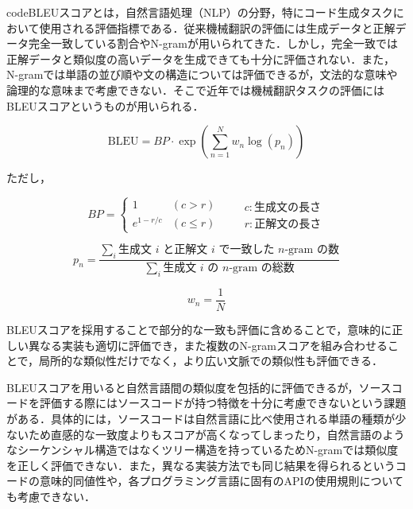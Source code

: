 \documentclass[11pt]{jreport}
\begin{document}
codeBLEUスコアとは，自然言語処理（NLP）の分野，特にコード生成タスクにおいて使用される評価指標である．従来機械翻訳の評価には生成データと正解データ完全一致している割合やN-gramが用いられてきた．しかし，完全一致では正解データと類似度の高いデータを生成できても十分に評価されない．また，N-gramでは単語の並び順や文の構造については評価できるが，文法的な意味や論理的な意味まで考慮できない．そこで近年では機械翻訳タスクの評価にはBLEUスコアというものが用いられる．

\begin{displaymath}
\text{BLEU} = BP \cdot \exp\left(\sum_{n=1}^{N} w_n \log(p_n)\right)
\end{displaymath}

\noindent
ただし，

\begin{displaymath}
BP =
\begin{cases} 
1 & (c > r) \\ 
e^{1 - r/c} & (c \leq r)
\end{cases}
\quad
\begin{aligned}
&c: \text{生成文の長さ} \\
&r: \text{正解文の長さ}
\end{aligned}
\end{displaymath}

\vspace{1em}

\begin{displaymath}
p_n = \frac{\sum_{i} \text{生成文 }i \text{ と正解文 }i \text{ で一致した } n\text{-gram の数}}{\sum_{i} \text{生成文 }i\text{ の } n\text{-gram の総数}}
\end{displaymath}

\vspace{1em}

\begin{displaymath}
w_n = \frac{1}{N}
\end{displaymath}

BLEUスコアを採用することで部分的な一致も評価に含めることで，意味的に正しい異なる実装も適切に評価でき，また複数のN-gramスコアを組み合わせることで，局所的な類似性だけでなく，より広い文脈での類似性も評価できる．

BLEUスコアを用いると自然言語間の類似度を包括的に評価できるが，ソースコードを評価する際にはソースコードが持つ特徴を十分に考慮できないという課題がある．具体的には，ソースコードは自然言語に比べ使用される単語の種類が少ないため直感的な一致度よりもスコアが高くなってしまったり，自然言語のようなシーケンシャル構造ではなくツリー構造を持っているためN-gramでは類似度を正しく評価できない．また，異なる実装方法でも同じ結果を得られるというコードの意味的同値性や，各プログラミング言語に固有のAPIの使用規則についても考慮できない．
\end{document}
